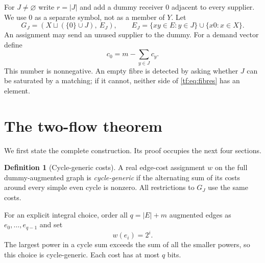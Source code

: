 \documentclass[11pt]{article}
\numberwithin{equation}{section}
\theoremstyle{definition}
\newtheorem{definition}[theorem]{Definition}
\begin{document}
For $J\ne\varnothing$ write $r=|J|$ and add a dummy receiver $0$ adjacent to
every supplier. We use $0$ as a separate symbol, not as a member of $Y$.
Let
\begin{equation}
 G_J=(X\sqcup(\{0\}\cup J),\ E_J),\qquad
 E_J=\{xy\in E:y\in J\}\cup\{x0:x\in X\}.
 \label{tf:eq:augmentation}
\end{equation}
An assignment may send an unused supplier to the dummy. For a demand
vector define
\begin{equation}
 c_0=m-\sum_{y\in J}c_y.
 \label{tf:eq:c0}
\end{equation}
This number is nonnegative. An empty fibre is detected by asking whether
$J$ can be saturated by a matching; if it cannot, neither side of
\eqref{tf:eq:fibres} has an element.

\section{The two-flow theorem}
\label{tf:sec:main}
We first state the complete construction. Its proof occupies the next
four sections.

\begin{definition}[Cycle-generic costs]
A real edge-cost assignment $w$ on the full dummy-augmented graph is
\emph{cycle-generic} if the alternating sum of its costs around every
simple even cycle is nonzero. All restrictions to $G_J$ use the same costs.
\end{definition}

For an explicit integral choice, order all $q=|E|+m$ augmented edges as
$e_0,\ldots,e_{q-1}$ and set
\begin{equation}
 w(e_i)=2^i.
 \label{tf:eq:costs}
\end{equation}
The largest power in a cycle sum exceeds the sum of all the smaller
powers, so this choice is cycle-generic. Each cost has at most $q$ bits.
\end{document}

